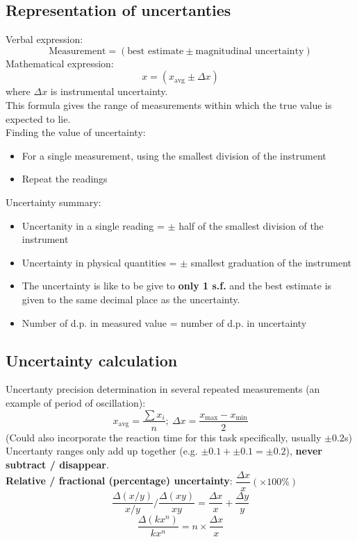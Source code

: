 \subsection{Representation of uncertanties}
Verbal expression:
\[\text{Measurement}=(\text{best estimate}\pm \text{magnitudinal uncertainty})\]
Mathematical expression:
\[x=(x_\text{avg} \pm \Delta x)\]
where $\Delta x$ is instrumental uncertainty. \\
This formula gives the range of measurements within which the true value is expected to lie.\\
Finding the value of uncertainty:
\begin{itemize}
  \item For a single measurement, using the smallest division of the instrument
  \item Repeat the readings
\end{itemize}
Uncertainty summary:
\begin{itemize}
  \item Uncertanity in a single reading = $\pm$ half of the smallest division of the instrument
  \item Uncertainty in physical quantities = $\pm$ smallest graduation of the instrument
  \item The uncertainty is like to be give to \textbf{only 1 s.f.} and the best estimate is given to the same decimal place as the uncertainty.
  \item Number of d.p. in measured value = number of d.p. in uncertainty
\end{itemize}
\subsection{Uncertainty calculation}
Uncertanty precision determination in several repeated measurements (an example of period of oscillation): 
\[x_\text{avg}=\dfrac{\sum{x_i}}{n};\ \Delta x=\dfrac{x_\text{max}-x_\text{min}}{2}\]
(Could also incorporate the reaction time for this task specifically, usually $\pm 0.2$s)\\
Uncertanty ranges only add up together (e.g. $\pm 0.1 + \pm 0.1 = \pm 0.2$), \textbf{never subtract / disappear}.\\
\textbf{Relative / fractional (percentage) uncertainty}: $\dfrac{\Delta x}{x} (\times 100\%)$\\
\[\dfrac{\Delta(x/y)}{x/y} \Big/ \dfrac{\Delta (xy)}{xy}=\dfrac{\Delta x}{x}+\dfrac{\Delta y}{y}\]
\[\dfrac{\Delta (kx^n)}{kx^n}=n\times \dfrac{\Delta x}{x}\]
